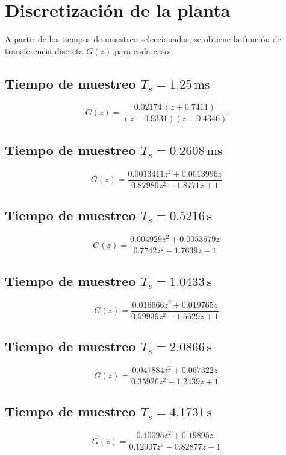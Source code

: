 \section{Discretización de la planta}

A partir de los tiempos de muestreo seleccionados, se obtiene la función de transferencia discreta $G(z)$ para cada caso:

\subsection*{Tiempo de muestreo $T_s = 1.25 \, \text{ms}$}
\[
G(z) = \frac{0.02174 \, (z + 0.7411)}{(z - 0.9331)(z - 0.4346)}
\]

\subsection*{Tiempo de muestreo $T_s = 0.2608 \, \text{ms}$}
\[
G(z) = \frac{0.0013411 z^2 + 0.0013996 z}{0.87989 z^2 - 1.8771 z + 1}
\]

\subsection*{Tiempo de muestreo $T_s = 0.5216 \, \text{s}$}
\[
G(z) = \frac{0.004929 z^2 + 0.0053679 z}{0.7742 z^2 - 1.7639 z + 1}
\]

\subsection*{Tiempo de muestreo $T_s = 1.0433 \, \text{s}$}
\[
G(z) = \frac{0.016666 z^2 + 0.019765 z}{0.59939 z^2 - 1.5629 z + 1}
\]

\subsection*{Tiempo de muestreo $T_s = 2.0866 \, \text{s}$}
\[
G(z) = \frac{0.047884 z^2 + 0.067322 z}{0.35926 z^2 - 1.2439 z + 1}
\]

\subsection*{Tiempo de muestreo $T_s = 4.1731 \, \text{s}$}
\[
G(z) = \frac{0.10095 z^2 + 0.19895 z}{0.12907 z^2 - 0.82877 z + 1}
\]
\newpage